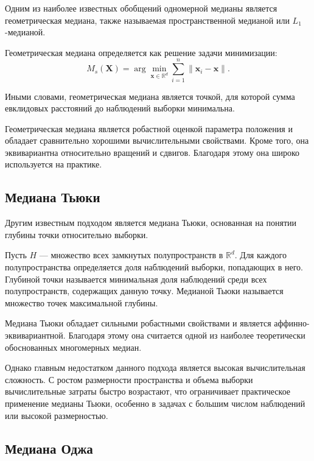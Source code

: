 Одним из наиболее известных обобщений одномерной медианы является геометрическая медиана, также называемая пространственной медианой или $L_1$-медианой.

Геометрическая медиана определяется как решение задачи минимизации:
\begin{equation*}
M_s(\mathbf{X})= \arg\min_{\mathbf{x}\in \mathbb{R}^d} \sum\limits_{i=1}^{n}\|\mathbf{x}_i-\mathbf{x}\|.
\end{equation*}

Иными словами, геометрическая медиана является точкой, для которой сумма евклидовых расстояний до наблюдений выборки минимальна. 

Геометрическая медиана является робастной оценкой параметра положения и обладает сравнительно хорошими вычислительными свойствами. Кроме того, она эквивариантна относительно вращений и сдвигов. Благодаря этому она широко используется на практике.



\subsection{Медиана Тьюки}

Другим известным подходом является медиана Тьюки, основанная на понятии глубины точки относительно выборки.

Пусть $H$ --- множество всех замкнутых полупространств в $\mathbb{R}^d$. Для каждого полупространства определяется доля наблюдений выборки, попадающих в него. Глубиной точки называется минимальная доля наблюдений среди всех полупространств, содержащих данную точку. Медианой Тьюки называется множество точек максимальной глубины.

Медиана Тьюки обладает сильными робастными свойствами и является аффинно-эквивариантной. Благодаря этому она считается одной из наиболее теоретически обоснованных многомерных медиан.

Однако главным недостатком данного подхода является высокая вычислительная сложность. С ростом размерности пространства и объема выборки вычислительные затраты быстро возрастают, что ограничивает практическое применение медианы Тьюки, особенно в задачах с большим числом наблюдений или высокой размерностью.


\subsection{Медиана Оджа}

